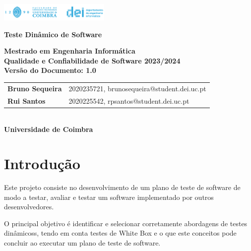 \documentclass{article}
\begin{document}
\setlength{\parindent}{20pt}
\begin{titlepage}
    \centering
    \vspace*{1cm}

    \includegraphics[width=0.4\textwidth]{Images/dei_thumb.png} %

    \vspace{1.5cm}
    {\LARGE \textbf{Teste Dinâmico de Software} \par}
   
    

    \vspace{2.5cm}
    \textbf{Mestrado em Engenharia Informática} \\
    \textbf{Qualidade e Confiabilidade de Software 2023/2024} \\
    \vspace{0.5cm} 
    \textbf{Versão do Documento: 1.0} \\
    \vspace{3cm}
    \begin{tabular}{ll}
        \textbf{Bruno Sequeira} & 2020235721, brunosequeira@student.dei.uc.pt \\
        \textbf{Rui Santos} & 2020225542, rpsantos@student.dei.uc.pt
        
      

    \end{tabular}\\
    \vspace{1.5cm} 
    \textbf{Universidade de Coimbra}

    \date{}

    \vfill

\end{titlepage}
   

\clearpage
\tableofcontents
\clearpage
\listoffigures
\listoftables
\clearpage


\section{Introdução}
\texttt{}\par Este projeto consiste no desenvolvimento de um plano de teste de software de modo a testar, avaliar e testar um software implementado por outros desenvolvedores.\\ 

\texttt{}\par O principal objetivo é identificar e selecionar corretamente abordagens de testes dinâmicoss, tendo em conta testes de White Box e o que este conceitos pode concluir ao executar um plano de teste de software.
\end{document}
